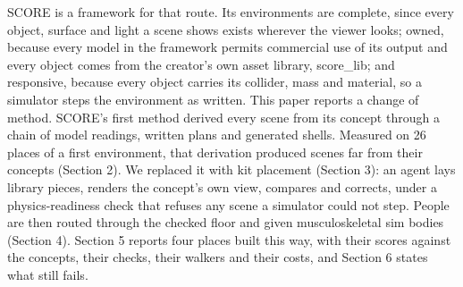 SCORE is a framework for that route. Its environments are complete, since every object, surface and light a scene shows exists wherever the viewer looks; owned, because every model in the framework permits commercial use of its output and every object comes from the creator's own asset library, score\_lib; and responsive, because every object carries its collider, mass and material, so a simulator steps the environment as written. This paper reports a change of method. SCORE's first method derived every scene from its concept through a chain of model readings, written plans and generated shells. Measured on 26 places of a first environment, that derivation produced scenes far from their concepts (Section 2). We replaced it with kit placement (Section 3): an agent lays library pieces, renders the concept's own view, compares and corrects, under a physics-readiness check that refuses any scene a simulator could not step. People are then routed through the checked floor and given musculoskeletal sim bodies (Section 4). Section 5 reports four places built this way, with their scores against the concepts, their checks, their walkers and their costs, and Section 6 states what still fails.
